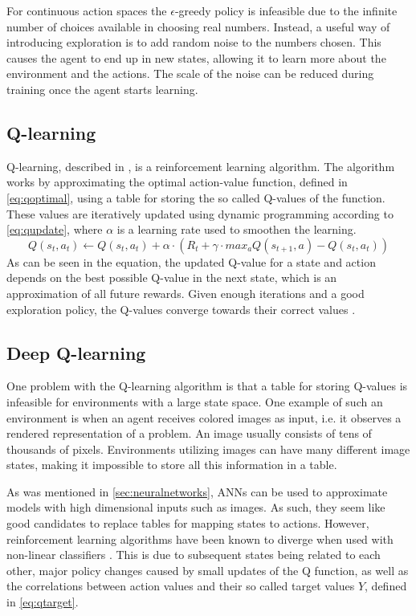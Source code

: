 \documentclass{kththesis}
\begin{document}
For continuous action spaces the $\epsilon$-greedy policy is infeasible due to the infinite number of choices available in choosing real numbers. Instead, a useful way of introducing exploration is to add random noise to the numbers chosen. This causes the agent to end up in new states, allowing it to learn more about the environment and the actions. The scale of the noise can be reduced during training once the agent starts learning. \parencite{lillicrap2015continuous}

\subsection{Q-learning}
\label{subsec:qlearning}
Q-learning, described in \textcite{watkins1992q}, is a reinforcement learning algorithm. The algorithm works by approximating the optimal action-value function, defined in \autoref{eq:qoptimal}, using a table for storing the so called Q-values of the function. These values are iteratively updated using dynamic programming according to \autoref{eq:qupdate}, where $\alpha$ is a learning rate used to smoothen the learning. 
\begin{equation}
\label{eq:qupdate}
Q(s_t, a_t) \leftarrow Q(s_t, a_t) + \alpha \cdot (R_t + \gamma \cdot max_a Q(s_{t+1}, a) - Q(s_t, a_t))
\end{equation}
As can be seen in the equation, the updated Q-value for a state and action depends on the best possible Q-value in the next state, which is an approximation of all future rewards. Given enough iterations and a good exploration policy, the Q-values converge towards their correct values \parencite{watkins1992q}.

\subsection{Deep Q-learning}
\label{subsec:deepqlearning}
One problem with the Q-learning algorithm is that a table for storing Q-values is infeasible for environments with a large state space. One example of such an environment is when an agent receives colored images as input, i.e. it observes a rendered representation of a problem. An image usually consists of tens of thousands of pixels. Environments utilizing images can have many different image states, making it impossible to store all this information in a table.

As was mentioned in \autoref{sec:neuralnetworks}, ANNs can be used to approximate models with high dimensional inputs such as images. As such, they seem like good candidates to replace tables for mapping states to actions. However, reinforcement learning algorithms have been known to diverge when used with non-linear classifiers \parencite{tsitsiklis1997analysis}. This is due to subsequent states being related to each other, major policy changes caused by small updates of the Q function, as well as the correlations between action values and their so called target values $Y$, defined in \autoref{eq:qtarget}.
\end{document}

